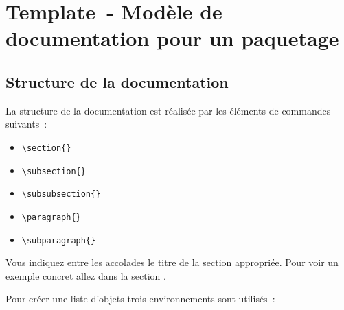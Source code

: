 
\section {Template~- Modèle de documentation pour un paquetage}

\subsection {Structure de la documentation}

La structure de la documentation est réalisée par les éléments de commandes suivants~:
\begin{itemize}
\item \verb*?\section{}?
\item \verb*?\subsection{}?
\item \verb*?\subsubsection{}?
\item \verb*?\paragraph{}?
\item \verb*?\subparagraph{}?
\end{itemize}

Vous indiquez entre les accolades le titre de la section appropriée. Pour voir
un exemple concret allez dans la section
.

Pour créer une liste d'objets trois environnements sont utilisés~:

